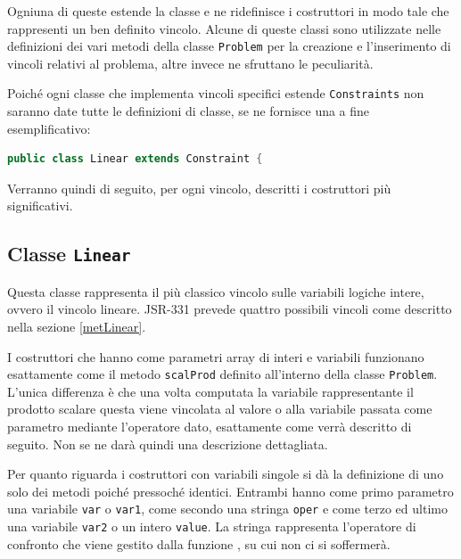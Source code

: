 Ogniuna di queste estende la classe  e ne ridefinisce i 
costruttori in modo
tale che rappresenti un ben definito vincolo. Alcune di queste classi sono 
utilizzate
nelle definizioni dei vari metodi della classe \texttt{Problem} per la
creazione e l'inserimento di vincoli relativi al problema, altre invece ne
sfruttano le peculiarità.

Poiché ogni classe che implementa vincoli specifici estende 
\texttt{Constraints} non saranno date tutte le definizioni di classe, se ne
fornisce una a fine esemplificativo:
\begin{lstlisting}[language = Java,frame = single]
public class Linear extends Constraint {
\end{lstlisting}
Verranno quindi di seguito, per ogni vincolo, descritti i costruttori più
significativi.

\subsection{Classe \texttt{Linear}}\label{Linear}
Questa classe rappresenta il più classico vincolo sulle variabili logiche
intere, ovvero il vincolo lineare. JSR-331 prevede quattro possibili
vincoli come descritto nella sezione \ref{metLinear}. 

I costruttori che hanno come parametri array di interi e variabili funzionano
esattamente come il metodo \texttt{scalProd} definito all'interno della
classe \texttt{Problem}. L'unica differenza è che una volta computata la
variabile rappresentante il prodotto scalare questa viene vincolata al valore
o alla variabile passata come parametro mediante l'operatore dato, esattamente
come verrà descritto di seguito.
Non se ne darà quindi una descrizione dettagliata.

Per quanto riguarda i costruttori con variabili singole si dà la definizione
di uno solo dei metodi poiché pressoché identici. Entrambi hanno come primo
parametro una variabile \texttt{var} o \texttt{var1}, come secondo una stringa 
\texttt{oper} e come terzo ed ultimo una variabile \texttt{var2} o un intero
\texttt{value}.
La stringa  rappresenta
l'operatore di confronto che viene gestito dalla funzione ,
su cui non ci si soffermerà.

